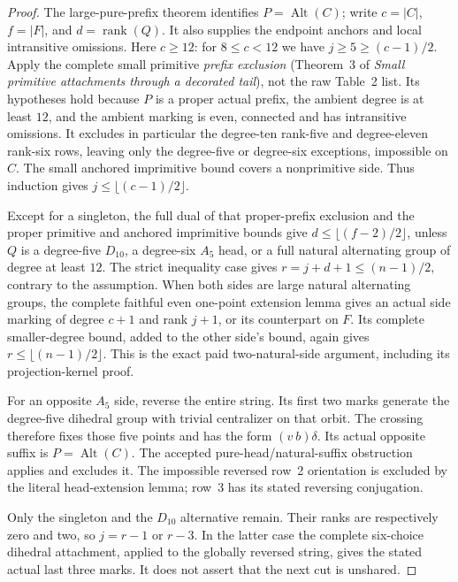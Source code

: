 \documentclass[11pt,a4paper]{article}
\newcommand{\Alt}{\operatorname{Alt}}
\begin{document}
\begin{proof}
The large-pure-prefix theorem identifies $P=\Alt(C)$; write
$c=|C|$, $f=|F|$, and $d=\operatorname{rank}(Q)$.
It also supplies the endpoint anchors and local intransitive omissions.
Here $c\ge12$: for $8\le c<12$ we have $j\ge5\ge(c-1)/2$.
Apply the complete small primitive \emph{prefix exclusion}
(Theorem~3 of \emph{Small primitive attachments through a decorated
tail}), not the raw Table~2 list. Its hypotheses hold because $P$
is a proper actual prefix, the ambient degree is at least $12$,
and the ambient marking is even, connected and has intransitive
omissions. It excludes in particular the degree-ten rank-five and
degree-eleven rank-six rows, leaving only the degree-five or
degree-six exceptions, impossible on $C$. The small anchored
imprimitive bound covers a nonprimitive side. Thus induction gives
$j\le\lfloor(c-1)/2\rfloor$.

Except for a singleton, the full dual of that proper-prefix exclusion and
the proper primitive and anchored imprimitive bounds give
$d\le\lfloor(f-2)/2\rfloor$, unless $Q$ is a degree-five $D_{10}$,
a degree-six $A_5$ head, or a full natural alternating group of
degree at least $12$. The strict inequality case gives
$r=j+d+1\le(n-1)/2$, contrary to the assumption.
When both sides are large natural alternating groups, the complete
faithful even one-point extension lemma gives an actual side marking
of degree $c+1$ and rank $j+1$, or its counterpart on $F$.
Its complete smaller-degree bound, added to the other side's bound,
again gives $r\le\lfloor(n-1)/2\rfloor$. This is the exact paid
two-natural-side argument, including its projection-kernel proof.

For an opposite $A_5$ side, reverse the entire string. Its first
two marks generate the degree-five dihedral group with trivial
centralizer on that orbit. The crossing therefore fixes those five
points and has the form $(v\ b)\delta$. Its actual opposite
suffix is $P=\Alt(C)$. The accepted pure-head/natural-suffix
obstruction applies and excludes it. The impossible reversed
row~2 orientation is excluded by the literal head-extension lemma;
row~3 has its stated reversing conjugation.

Only the singleton and the $D_{10}$ alternative remain.
Their ranks are respectively zero and two, so $j=r-1$ or $r-3$.
In the latter case the complete six-choice dihedral attachment,
applied to the globally reversed string, gives the stated actual
last three marks. It does not assert that the next cut is unshared.
\end{proof}
\end{document}
